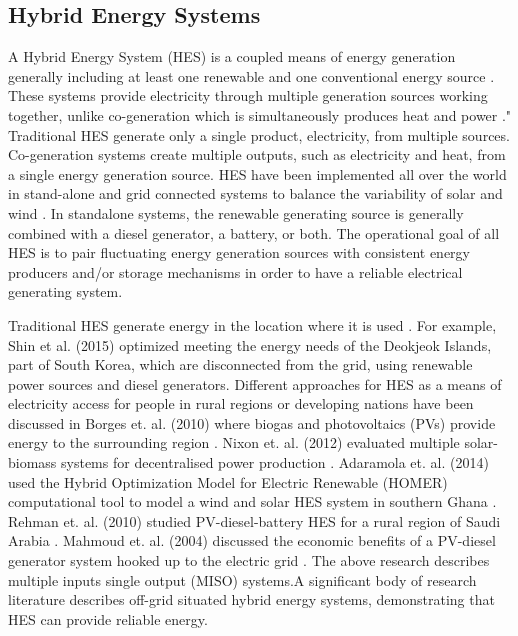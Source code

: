 \documentclass{article}                                                                           %
\begin{document}
\begin{linenumbers}
\subsection{Hybrid Energy Systems}
A Hybrid Energy System (HES) is a coupled means of energy generation generally including at least one renewable and one conventional energy source \cite {Ibrahim2011}. These systems provide electricity through multiple generation sources working together, unlike co-generation which is simultaneously produces heat and power \cite{Rosen2005}." Traditional HES generate only a single product, electricity, from multiple sources. Co-generation systems create multiple outputs, such as electricity and heat, from a single energy generation source. HES have been implemented all over the world in stand-alone and grid connected systems to balance the variability of solar and wind \cite {Garcia2015, Qi2014, Shin2015, Nixon2012, Adaramola2014, Goodbody2013, BorgesNeto2010, McGowan1996}. In standalone systems, the renewable generating source is generally combined with a diesel generator, a battery, or both. The operational goal of all HES is to pair fluctuating energy generation sources with consistent energy producers and/or storage mechanisms in order to have a reliable electrical generating system.

Traditional HES generate energy in the location where it is used \cite {Shin2015, Nixon2012, Adaramola2014, Goodbody2013, McGowan1996}. For example, Shin et al. (2015) optimized meeting the energy needs of the Deokjeok Islands, part of South Korea, which are disconnected from the grid, using renewable power sources and diesel generators. Different approaches for HES as a means of electricity access for people in rural regions or developing nations have been discussed in Borges et. al. (2010) where biogas and photovoltaics (PVs) provide energy to the surrounding region \cite{BorgesNeto2010}. Nixon et. al. (2012) evaluated multiple solar-biomass systems for decentralised power production \cite{Nixon2012}. Adaramola et. al. (2014) used the Hybrid Optimization Model for Electric Renewable (HOMER) computational tool to model a wind and solar HES system in southern Ghana \cite{Adaramola2014}. Rehman et. al. (2010) studied PV-diesel-battery HES for a rural region of Saudi Arabia \cite{Rehman2010}. Mahmoud et. al. (2004) discussed the economic benefits of a PV-diesel generator system hooked up to the electric grid \cite {Mahmoud2004}. The above research describes multiple inputs single output (MISO) systems\cite{Garcia2013}.A significant body of research literature describes off-grid situated hybrid energy systems, demonstrating that HES can provide reliable energy.



\end{linenumbers}
\end{document}
